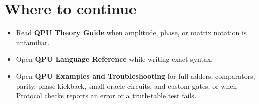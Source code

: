 \newcommand{\QpuDocTitle}{QPU Getting Started}
\newcommand{\QpuDocSubtitle}{Programming and Website Walkthrough}
\newcommand{\QpuHeaderTitle}{Getting Started}
\newcommand{\QpuDocDescription}{%
A beginner-first introduction to the QPU website, programming vocabulary,
a six-step learning path, classical logic, complete runnable protocols, a
reference for every on-screen control, and the first steps for correcting an
error.
}



\QpuTitlePage
\QpuContents










\section{Where to continue}

\begin{itemize}
  \item Read \textbf{QPU Theory Guide} when amplitude, phase, or matrix notation
  is unfamiliar.
  \item Open \textbf{QPU Language Reference} while writing exact syntax.
  \item Open \textbf{QPU Examples and Troubleshooting} for full adders,
  comparators, parity, phase kickback, small oracle circuits, and custom
  gates, or when Protocol checks reports an error or a truth-table test
  fails.
\end{itemize}


